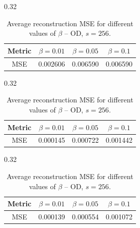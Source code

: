 \documentclass[a4paper,11pt]{article}
\begin{document}
\begin{table}[t]
\centering
\small
\begin{subtable}{0.32\linewidth}
\centering
\caption{RAW Reconstruction}
\begin{tabular}{cccc}
\hline
Metric & $\beta=0.01$ & $\beta=0.05$ & $\beta=0.1$ \\
\hline
MSE & 0.002606 & 0.006590 & 0.006590 \\
\hline
\end{tabular}
\end{subtable}
\hfill
\begin{subtable}{0.32\linewidth}
\centering
\caption{COV Reconstruction}
\begin{tabular}{cccc}
\hline
Metric & $\beta=0.01$ & $\beta=0.05$ & $\beta=0.1$ \\
\hline
MSE & 0.000145 & 0.000722 & 0.001442 \\
\hline
\end{tabular}
\end{subtable}
\hfill
\begin{subtable}{0.32\linewidth}
\centering
\caption{COR Reconstruction}
\begin{tabular}{cccc}
\hline
Metric & $\beta=0.01$ & $\beta=0.05$ & $\beta=0.1$ \\
\hline
MSE & 0.000139 & 0.000554 & 0.001072 \\
\hline
\end{tabular}
\end{subtable}
\caption{Average reconstruction MSE for different values of $\beta$ -- OD, $s=256$.}
\label{tab:mse_od_256}
\end{table}
\end{document}
